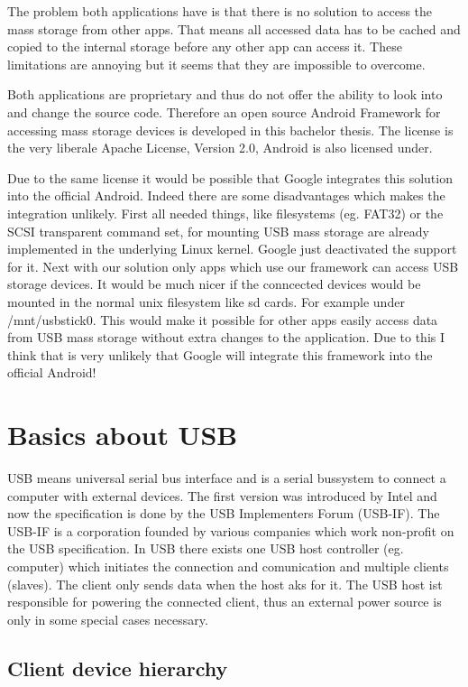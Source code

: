 The problem both applications have is that there is no solution to access the mass storage from other apps. That means all accessed data has to be cached and copied to the internal storage before any other app can access it. These limitations are annoying but it seems that they are impossible to overcome.

Both applications are proprietary and thus do not offer the ability to look into and change the source code. Therefore an open source Android Framework for accessing mass storage devices is developed in this bachelor thesis. The license is the very liberale Apache License, Version 2.0, Android is also licensed under.

Due to the same license it would be possible that Google integrates this solution into the official Android. Indeed there are some disadvantages which makes the integration unlikely. First all needed things, like filesystems (eg. FAT32) or the SCSI transparent command set, for mounting USB mass storage are already implemented in the underlying Linux kernel. Google just deactivated the support for it. Next with our solution only apps which use our framework can access USB storage devices. It would be much nicer if the conncected devices would be mounted in the normal unix filesystem like sd cards. For example under /mnt/usbstick0. This would make it possible for other apps easily access data from USB mass storage without extra changes to the application. Due to this I think that is very unlikely that Google will integrate this framework into the official Android!
 
\chapter{Basics about USB}

USB means universal serial bus interface and is a serial bussystem to connect a computer with external devices. The first version was introduced by Intel and now the specification is done by the USB Implementers Forum (USB-IF). The USB-IF is a corporation founded by various companies which work non-profit on the USB specification. In USB there exists one USB host controller (eg. computer) which initiates the connection and comunication and multiple clients (slaves). The client only sends data when the host aks for it. The USB host ist responsible for powering the connected client, thus an external power source is only in some special cases necessary.

\section{Client device hierarchy}

